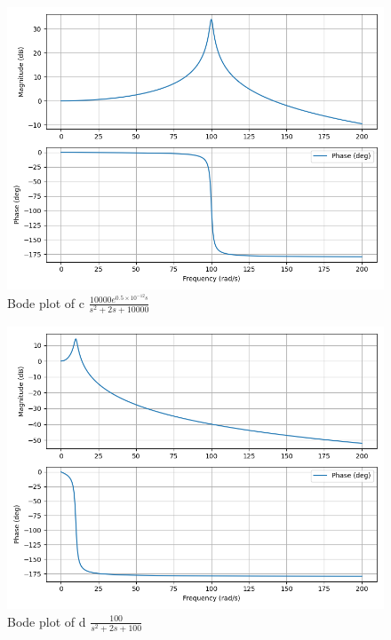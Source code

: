 \documentclass[journal,12pt,onecolumn]{IEEEtran}
\theoremstyle{remark}
\begin{document}
\begin{figure}[h]
    \centering
    \includegraphics[width=\linewidth]{figs/C.png}
    \caption{Bode plot of c $\frac{10000e^{0.5\times10^{-12}s}}{s^2+2s+10000}$}
\end{figure}
\begin{figure}[h]
    \centering
    \includegraphics[width=\linewidth]{figs/D.png}
    \caption{Bode plot of d $\frac{100}{s^2+2s+100}$}
\end{figure}
\end{document}
